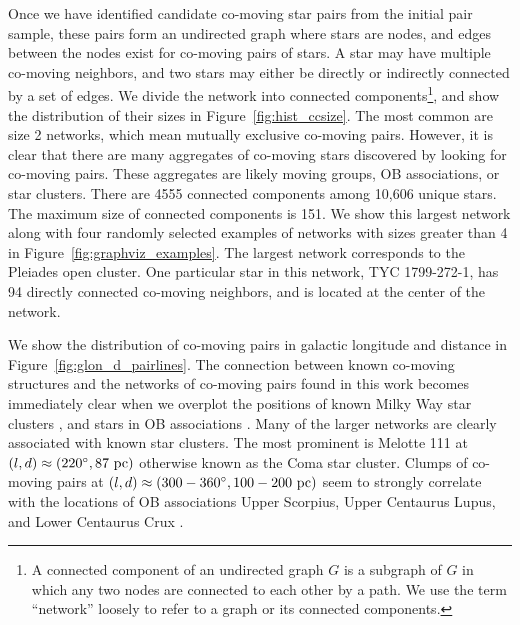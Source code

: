 \documentclass[manuscript, letterpaper]{aastex6}
\begin{document}
Once we have identified candidate co-moving star pairs from the initial pair
sample, these pairs form an undirected graph where stars are nodes, and edges
between the nodes exist for co-moving pairs of stars.
A star may have multiple co-moving neighbors, and two stars may either
be directly or indirectly connected by a set of edges.
We divide the network into connected components\footnote{A connected component of an undirected graph $G$
is a subgraph of $G$ in which any two nodes are connected to each other by a path.
We use the term ``network'' loosely to refer to a graph or its connected components.},
and show the distribution of their sizes in Figure~\ref{fig:hist_ccsize}.
The most common are size 2 networks, which mean mutually exclusive co-moving
pairs. However, it is clear that there are many aggregates of co-moving stars
discovered by looking for co-moving pairs.
These aggregates are likely moving groups, OB associations, or star clusters.
There are 4555 connected components among 10,606 unique stars.
The maximum size of connected components is 151.
We show this largest network along with four randomly selected
examples of networks with sizes greater than 4 in Figure~\ref{fig:graphviz_examples}.
The largest network corresponds to the Pleiades open cluster.
One particular star in this network, TYC 1799-272-1, has 94 directly connected
co-moving neighbors, and is located at the center of the network.

We show the distribution of co-moving pairs in galactic longitude and
distance in Figure~\ref{fig:glon_d_pairlines}.
The connection between known co-moving structures and the networks of co-moving
pairs found in this work becomes immediately clear when
we overplot the positions of known Milky Way star clusters \citep{Kharchenko:2016aa},
and stars in OB associations \citep{de-Zeeuw:1999aa}.
Many of the larger networks are clearly associated with known star clusters.
The most prominent is Melotte 111 at
$(l,d)\approx (220\mbox{$^\circ$}, 87~\textrm{pc})$ otherwise known as the Coma star cluster.
Clumps of co-moving pairs at $(l,d)\approx (300-360\mbox{$^\circ$}, 100-200~\textrm{pc})$
seem to strongly correlate with the locations of OB associations
Upper Scorpius, Upper Centaurus Lupus, and Lower Centaurus Crux
\citep{de-Zeeuw:1999aa}.
\end{document}
